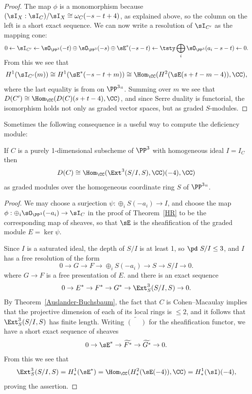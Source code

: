 \begin{proof}
The map $\phi$ is a monomorphism because $(\sI_X:\sI_C)/\sI_X \cong
\omega_C(-s-t+4)$, as explained above, so the column on the left is a
short exact sequence.
We can now write a resolution of $\sI_{C'}$ as the mapping cone:
$$
0\leftarrow \sI_{C'} \leftarrow \sO_{\PP^3}(-t)\oplus \sO_{\PP^3}(-s)
\oplus \sE^*(-s-t) \leftarrow
\smash[b]{\tsty\bigoplus\limits_i\sO_{\PP^3}(a_i-s-t)}\leftarrow 0.
$$
From this we see that
$$
H^1(\sI_{C'}(m)) \cong H^1(\sE^*(-s-t+m)) \cong \Hom_\CC(
H^2(\sE(s+t-m-4)), \CC)
,
$$
where the last equality is from
on $\PP^3` `$. Summing
%
over $m$ we see that
$D(C') \cong \Hom_\CC(D(C)(s+t-4), \CC)$,
and since Serre duality is functorial, the isomorphism holds not only
as graded vector spaces, but as graded $S$-modules.
\end{proof}

Sometimes the following consequence is a useful way to compute the
deficiency module:

\begin{proposition}\label{deficiency as dual of Ext}
If $C$ is a purely 1-dimensional subscheme of $\PP^3$ with homogeneous
ideal $I = I_C$ then
$$
D(C) \cong \Hom_\CC (\Ext^3(S/I, S), \CC)(-4), \CC)
$$
as graded modules over the homogeneous coordinate ring $S$ of $\PP^3` `$.
\unif
\end{proposition}

\begin{proof}
We may choose a surjection $\psi: \oplus_iS(-a_i)\to I$, and choose
the map
$\phi: \oplus_i\sO_{\PP^3}(-a_i)\to\sI_C$
in the proof of Theorem~\ref{HR}
to be the corresponding map of sheaves, so that
$\sE$ is the sheafification of the graded module $E = \ker \psi$.

Since $I$ is a saturated ideal,
the depth of $S/I$ is at least 1, so $\pd\ S/I\leq 3$, and $I$ has a
free resolution of the form
$$
0\to G \to F \to \oplus_iS(-a_i) \to S\to S/I \to 0.
$$
where $G\to F$ is a free presentation of $E$. and there is an exact
sequence
$$
0 \to E^* \to F^* \to G^* \to \Ext^3_S(S/I, S) \to 0.
$$
By Theorem~\ref{Auslander-Buchsbaum}, the fact that $C$ is Cohen--Macaulay
implies that the projective dimension of each of its
local rings is $\leq 2$, and it follows that
$\Ext^3_S(S/I, S)$ has finite length. Writing $\widetilde{(\phantom{-})}$
for the sheafification functor,
we have a short exact sequence of sheaves
$$
0\to \sE^* \to \widetilde{F^*} \to \widetilde{G^*}\to 0.
$$
From this we see that
$$
\Ext^3_S(S/I,S) = H^1_*(\sE^*) = \Hom_\CC( H^2_*(\sE(-4)),\CC) =
H^1_*(\sI)(-4),
$$
proving the assertion.
\end{proof}

